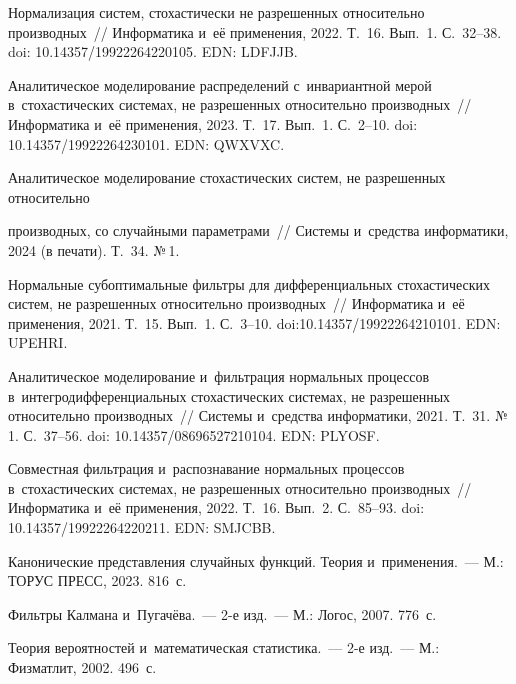 \begin{multicols}{2}
{{\begin{thebibliography}{99}
Нормализация систем, стохастически не разрешенных относительно производных~// 
Информатика и~её применения, 2022. Т.~16. Вып.~1. С.~32--38. doi: 
10.14357/19922264220105. EDN: \mbox{LDFJJB}.

Аналитическое моделирование распределений с~инвариантной мерой в~стохастических 
системах, не разрешенных относительно производных~// Информатика и~её 
применения, 2023. Т.~17. Вып.~1. С.~2--10. doi: 10.14357/19922264230101. EDN: 
QWXVXC.

Аналитическое моделирование стохастических  сис\-тем, не разрешенных относительно\linebreak\vspace*{-12pt}

\pagebreak

\noindent 
производных, со случайными параметрами~// Сис\-те\-мы и~средства информатики, 2024  (в печати). 
Т.~34. №\,1.

Нормальные субоптимальные фильт\-ры для дифференциальных стохастических систем, не 
разрешенных относительно производных~// Информатика и~её применения, 2021. 
Т.~15. Вып.~1. С.~3--10. doi:10.14357/19922264210101. EDN: UPEHRI. 

Аналитическое моделирование и~фильтрация нормальных процессов 
в~интегродифференциальных стохастических системах, не разрешенных относительно 
производных~// Системы и~средства информатики, 2021. Т.~31. №\,1. С.~37--56. doi: 
10.14357/08696527210104. EDN: PLYOSF.


Совместная фильтрация и~распознавание нормальных процессов в~стохастических 
сис\-те\-мах, не разрешенных относительно производных~// Информатика и~её 
применения, 2022. Т.~16. Вып.~2. С.~85--93. doi: 10.14357/19922264220211. EDN: 
SMJCBB.

Канонические представления случайных функций. Теория и~применения.~--- М.: ТОРУС 
ПРЕСС, 2023. 816~с.

Фильтры Калмана и~Пугачёва.~--- 2-е изд.~--- М.: Логос, 2007. 
776~с.

Теория вероятностей и~математическая статистика.~--- 2-е изд.~--- 
М.: Физматлит, 2002. 496~с.
\end{thebibliography}

 }
 }

\end{multicols}

